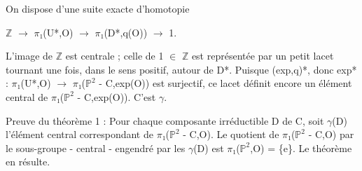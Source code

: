 \documentclass[10pt,a4paper]{article}
\begin{document}
\begin{adjustbox}{max totalsize={\textwidth}{0.945\textheight},center}
\begin{minipage}{\textwidth}
\noindent On dispose d'une suite exacte d'homotopie\par\smallskip
\noindent \ensuremath{ℤ} \ensuremath{→} \ensuremath{π₁}(U*,O) \ensuremath{→} \ensuremath{π₁}(D*,q(O)) \ensuremath{→} 1.\par\smallskip
\noindent L'image de \ensuremath{ℤ} est centrale ; celle de 1 \ensuremath{∈} \ensuremath{ℤ} est représentée par un petit lacet tournant une fois, dans le sens positif, autour de D*. Puisque (exp,q)*, donc exp* : \ensuremath{π₁}(U*,O) \ensuremath{→} \ensuremath{π₁}(\ensuremath{ℙ^2} - C,exp(O)) est surjectif, ce lacet définit encore un élément central de \ensuremath{π₁}(\ensuremath{ℙ^2} - C,exp(O)). C'est \ensuremath{γ}.\par\smallskip
{} Preuve du théorème 1 : Pour chaque composante irréductible D de C, soit \ensuremath{γ}(D) l'élément central correspondant de \ensuremath{π₁}(\ensuremath{ℙ^2} - C,O). Le quotient de \ensuremath{π₁}(\ensuremath{ℙ^2} - C,O) par le sous-groupe - central - engendré par les \ensuremath{γ}(D) est \ensuremath{π₁}(\ensuremath{ℙ^2},O) = \{e\}. Le théorème en résulte.\par\smallskip
\end{minipage}
\end{adjustbox}
\newpage
\end{document}

